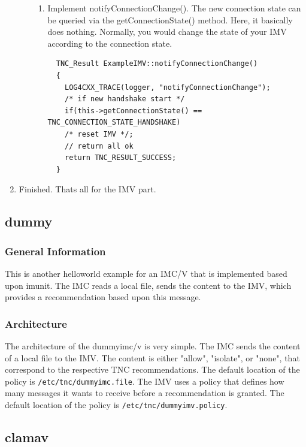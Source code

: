 \documentclass[a4paper,10pt]{scrartcl}
\begin{document}
\begin{enumerate}
\begin{enumerate}
\begin{enumerate}
  \item Implement notifyConnectionChange(). The new connection state can be queried via the getConnectionState() method.
  Here, it basically does nothing. Normally, you would change the state of your IMV according to the connection state.
  \begin{lstlisting}
  TNC_Result ExampleIMV::notifyConnectionChange()
  {
    LOG4CXX_TRACE(logger, "notifyConnectionChange");
    /* if new handshake start */
    if(this->getConnectionState() == TNC_CONNECTION_STATE_HANDSHAKE)
    /* reset IMV */;
    // return all ok
    return TNC_RESULT_SUCCESS;
  }
  \end{lstlisting}

  \end{enumerate}

 \end{enumerate}
 \item Finished. Thats all for the IMV part.
\end{enumerate}

\subsection{dummy}
\subsubsection{General Information}
This is another helloworld example for an IMC/V that is implemented based upon imunit.
The IMC reads a local file, sends the content to the IMV, which provides
a recommendation based upon this message.

\subsubsection{Architecture}
The architecture of the dummyimc/v is very simple. The IMC sends the content of a local
file to the IMV. The content is either "allow", "isolate", or "none", that correspond
to the respective TNC recommendations. The default location of the policy is
\texttt{/etc/tnc/dummyimc.file}. The IMV uses a policy that defines how many
messages it wants to receive before a recommendation is granted. The default
location of the policy is \texttt{/etc/tnc/dummyimv.policy}.

\subsection{clamav}
\end{document}

